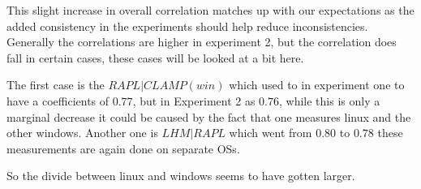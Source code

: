 This slight increase in overall correlation matches up with our expectations as the added consistency in the experiments should help reduce inconsistencies. Generally the correlations are higher in experiment 2, but the correlation does fall in certain cases, these cases will be looked at a bit here.

The first case is the $RAPL|CLAMP(win)$ which used to in experiment one to have a coefficients of $0.77$, but in Experiment 2 as $0.76$, while this is only a marginal decrease it could be caused by the fact that one measures linux and the other windows. Another one is $LHM|RAPL$ which went from $0.80$ to $0.78$ these measurements are again done on separate OSs. 

So the divide between linux and windows seems to have gotten larger.   









